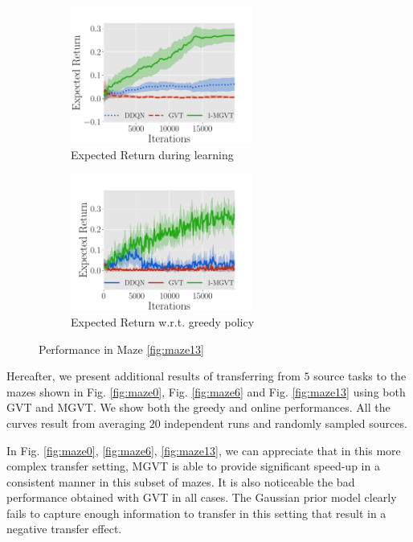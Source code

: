 \documentclass{article}
\begin{document}
\begin{figure}[h]
  \begin{subfigure}[b]{0.45\textwidth}
    \includegraphics[trim=0.0cm 0cm 1.8cm 1.3cm,clip=true,height=4.5cm]{images/maze/lrev_maze13.pdf}
    \caption{Expected Return during learning}
  \end{subfigure}
  \begin{subfigure}[b]{0.45\textwidth}
    \includegraphics[trim=0.0cm 0cm 1.8cm 1.3cm,clip=true,height=4.5cm]{images/maze/erew_maze13.pdf}
    \caption{Expected Return w.r.t. greedy policy}
  \end{subfigure}
  \caption{Performance in Maze \ref{fig:maze13} }
  \label{fig:rew-maze13}
\end{figure}

Hereafter, we present additional results of transferring from $5$ source tasks to the mazes shown in Fig. \ref{fig:maze0}, Fig. \ref{fig:maze6} and Fig. \ref{fig:maze13} using both GVT and MGVT. We show both the greedy and online performances. All the curves result from averaging $20$ independent runs and randomly sampled sources.

In Fig. \ref{fig:maze0}, \ref{fig:maze6}, \ref{fig:maze13}, we can appreciate that in this more complex transfer setting, MGVT is able to provide significant speed-up in a consistent manner in this subset of mazes. It is also noticeable the bad performance obtained with GVT in all cases. The Gaussian prior model clearly fails to capture enough information to transfer in this setting that result in a negative transfer effect.
\end{document}
